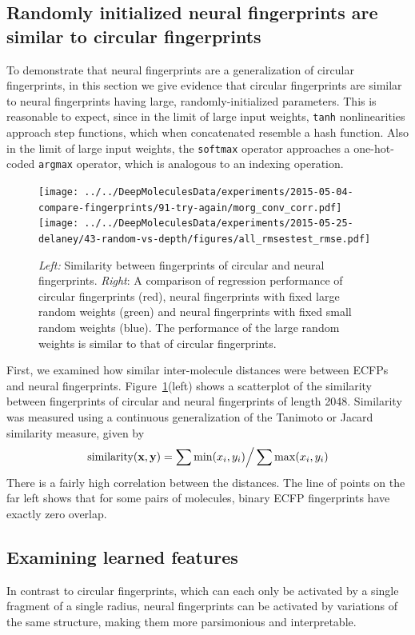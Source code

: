 \documentclass{article}
\newcommand{\vx}{\mathbf{x}}
\newcommand{\vy}{\mathbf{y}}
\begin{document}
\subsection{Randomly initialized neural fingerprints are similar to circular fingerprints}
\label{sec:random is equivalent}
To demonstrate that neural fingerprints are a generalization of circular fingerprints, in this section we give evidence that circular fingerprints are similar to neural fingerprints having large, randomly-initialized parameters.
This is reasonable to expect, since in the limit of large input weights, \texttt{tanh} nonlinearities approach step functions, which when concatenated resemble a hash function.
Also in the limit of large input weights, the \texttt{softmax} operator approaches a one-hot-coded \texttt{argmax} operator, which is analogous to an indexing operation.

\begin{figure}[h]
\centerline{\texttt{[image: ../../DeepMoleculesData/experiments/2015-05-04-compare-fingerprints/91-try-again/morg\_conv\_corr.pdf]}
\texttt{[image: ../../DeepMoleculesData/experiments/2015-05-25-delaney/43-random-vs-depth/figures/all\_rmsestest\_rmse.pdf]}
}
\caption{\emph{Left:} Similarity between fingerprints of circular and neural fingerprints.
\emph{Right}: A comparison of regression performance of circular fingerprints (red), neural fingerprints with fixed large random weights (green) and neural fingerprints with fixed small random weights (blue).
The performance of the large random weights is similar to that of circular fingerprints.
}
\label{fig:fingerprint similarity}
\end{figure}

First, we examined how similar inter-molecule distances were between ECFPs and neural fingerprints.
Figure~\ref{fig:fingerprint similarity}(left) shows a scatterplot of the similarity between fingerprints of circular and neural fingerprints of length 2048.
Similarity was measured using a continuous generalization of the Tanimoto or Jacard similarity measure, given by
\begin{equation}
\textnormal{similarity}(\vx, \vy) =  \sum \min(x_i, y_i) \Big/ \sum \max(x_i, y_i)
\end{equation}
There is a fairly high correlation between the distances.
The line of points on the far left shows that for some pairs of molecules, binary ECFP fingerprints have exactly zero overlap.

\subsection{Examining learned features}
In contrast to circular fingerprints, which can each only be activated by a single fragment of a single radius, neural fingerprints can be activated by variations of the same structure, making them more parsimonious and interpretable.
\end{document}

